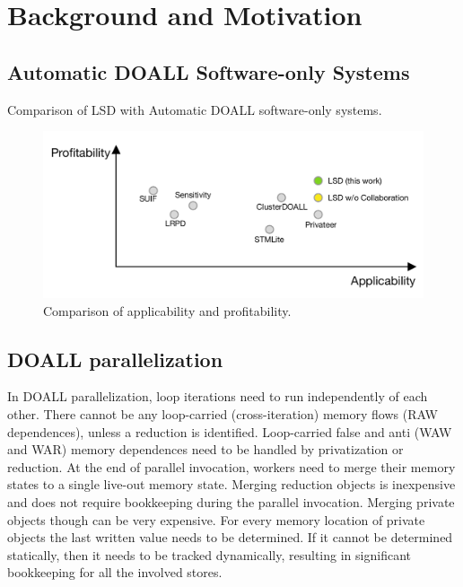 \section{Background and Motivation}
\label{sec:motivation}

\subsection{Automatic DOALL Software-only Systems}

\begin{table}
  
  \caption{
    Comparison of LSD with Automatic DOALL software-only systems.
  }
  \label{tab:related-work}
    \vspace{-5pt}
\end{table}

\begin{figure}
  \includegraphics[width=\columnwidth]{figures/profit-appli-compare}
  \caption{Comparison of applicability and profitability.}
  \label{fig:profit-appli-compare}
\end{figure}


\subsection{DOALL parallelization}

In DOALL parallelization, loop iterations need to run independently of each
other.  There cannot be any loop-carried (cross-iteration) memory flows (RAW
dependences), unless a reduction is identified. Loop-carried false and anti (WAW
and WAR) memory dependences need to be handled by privatization or reduction.
At the end of parallel invocation, workers need to merge their memory states to
a single live-out memory state.  Merging reduction objects is inexpensive and
does not require bookkeeping during the parallel invocation.  Merging private
objects though can be very expensive. For every memory location of private
objects the last written value needs to be determined. If it cannot be
determined statically, then it needs to be tracked dynamically, resulting in
significant bookkeeping for all the involved stores.




